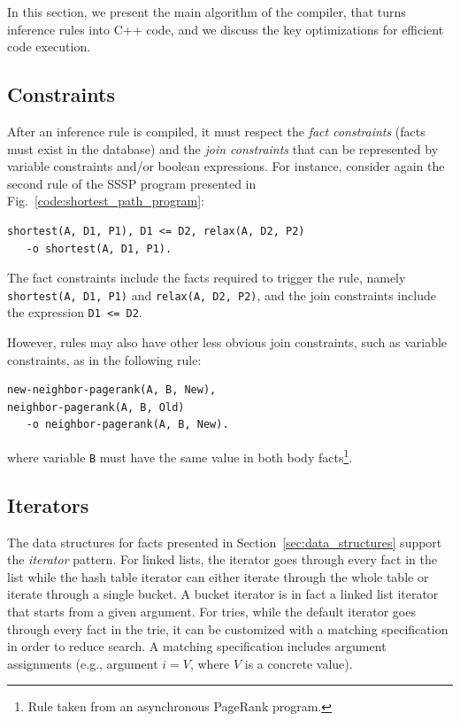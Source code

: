 
In this section, we present the main algorithm of the compiler, that turns
inference rules into C++ code, and we discuss the key optimizations for
efficient code execution.

\subsection{Constraints}

After an inference rule is compiled, it must respect the \emph{fact constraints}
(facts must exist in the database) and the \emph{join constraints} that can be
represented by variable constraints and/or boolean expressions. For instance,
consider again the second rule of the SSSP program presented in
Fig.~\ref{code:shortest_path_program}:

\begin{Verbatim}[fontsize=\scriptsize,label=example_rule]
shortest(A, D1, P1), D1 <= D2, relax(A, D2, P2)
   -o shortest(A, D1, P1).
\end{Verbatim}

The fact constraints include the facts required to trigger the rule, namely
\texttt{shortest(A, D1, P1)} and \texttt{relax(A, D2, P2)}, and the join
constraints include the expression \texttt{D1 <= D2}.

However, rules may also have other less obvious join constraints, such as
variable constraints, as in the following rule:

\begin{Verbatim}[fontsize=\scriptsize]
new-neighbor-pagerank(A, B, New),
neighbor-pagerank(A, B, Old)
   -o neighbor-pagerank(A, B, New).
\end{Verbatim}

\noindent where variable \texttt{B} must have the same value in both body
facts\footnote{Rule taken from an asynchronous PageRank program.}.

\subsection{Iterators}

The data structures for facts presented in Section~\ref{sec:data_structures}
support the \emph{iterator} pattern. For linked lists, the iterator goes
through every fact in the list while the hash table iterator can either iterate
through the whole table or iterate through a single bucket. A bucket iterator is
in fact a linked list iterator that starts from a given argument.
For tries, while the default iterator goes through every fact in
the trie, it can be customized with a matching specification in
order to reduce search. A matching specification includes argument
assignments (e.g., argument $i = V$, where $V$ is a concrete value).

